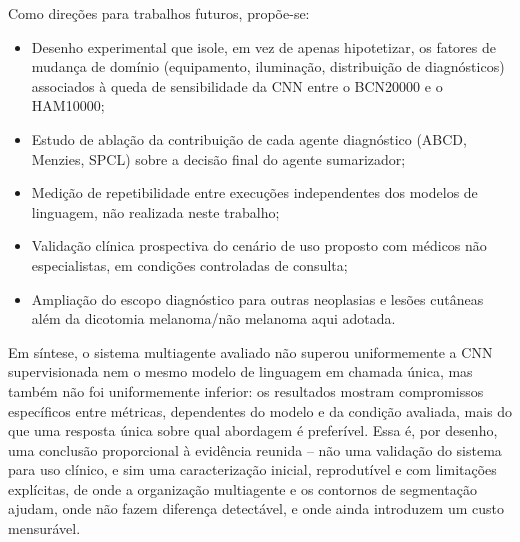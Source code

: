 Como direções para trabalhos futuros, propõe-se:
\begin{itemize}
	\item Desenho experimental que isole, em vez de apenas hipotetizar, os fatores de mudança de domínio (equipamento, iluminação, distribuição de diagnósticos) associados à queda de sensibilidade da CNN entre o BCN20000 e o HAM10000;
	\item Estudo de ablação da contribuição de cada agente diagnóstico (ABCD, Menzies, SPCL) sobre a decisão final do agente sumarizador;
	\item Medição de repetibilidade entre execuções independentes dos modelos de linguagem, não realizada neste trabalho;
	\item Validação clínica prospectiva do cenário de uso proposto com médicos não especialistas, em condições controladas de consulta;
	\item Ampliação do escopo diagnóstico para outras neoplasias e lesões cutâneas além da dicotomia melanoma/não melanoma aqui adotada.
\end{itemize}

Em síntese, o sistema multiagente avaliado não superou uniformemente a CNN supervisionada nem o mesmo modelo de linguagem em chamada única, mas também não foi uniformemente inferior: os resultados mostram compromissos específicos entre métricas, dependentes do modelo e da condição avaliada, mais do que uma resposta única sobre qual abordagem é preferível. Essa é, por desenho, uma conclusão proporcional à evidência reunida -- não uma validação do sistema para uso clínico, e sim uma caracterização inicial, reprodutível e com limitações explícitas, de onde a organização multiagente e os contornos de segmentação ajudam, onde não fazem diferença detectável, e onde ainda introduzem um custo mensurável.
